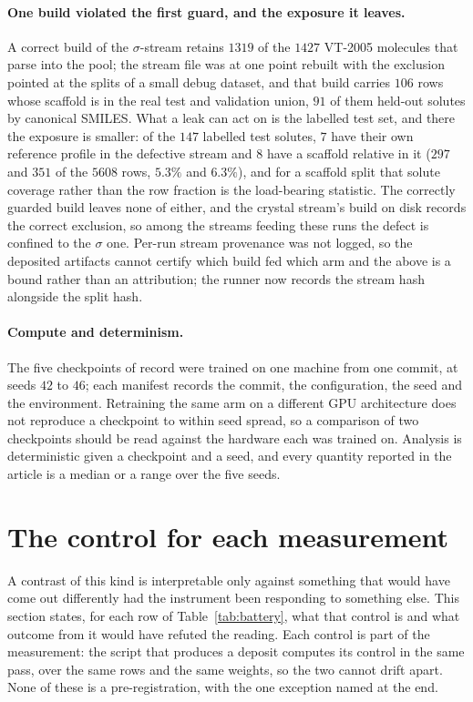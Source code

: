\paragraph{One build violated the first guard, and the exposure it leaves.}
A correct build of the $\sigma$-stream retains $1319$ of the $1427$ VT-2005 molecules that parse
into the pool; the stream file was at one point rebuilt with the exclusion pointed at the splits of
a small debug dataset, and that build carries $106$ rows whose scaffold is in the real test and
validation union, $91$ of them held-out solutes by canonical SMILES. What a leak can act on is the
labelled test set, and there the exposure is smaller: of the $147$ labelled test solutes, $7$ have
their own reference profile in the defective stream and $8$ have a scaffold relative in it ($297$
and $351$ of the $5608$ rows, $5.3\%$ and $6.3\%$), and for a scaffold split that solute coverage
rather than the row fraction is the load-bearing statistic. The correctly guarded build leaves none of either, and the crystal
stream's build on disk records the correct exclusion, so among the streams feeding these runs the
defect is confined to the $\sigma$ one. Per-run stream provenance was not logged, so the deposited
artifacts cannot certify which build fed which arm and the above is a bound rather than an
attribution; the runner now records the stream hash alongside the split hash.

\paragraph{Compute and determinism.}
The five checkpoints of record were trained on one machine from one commit, at seeds $42$ to $46$;
each manifest records the commit, the configuration, the seed and the environment. Retraining the
same arm on a different GPU architecture does not reproduce a checkpoint to within seed spread, so
a comparison of two checkpoints should be read against the hardware each was trained on. Analysis
is deterministic given a checkpoint and a seed, and every quantity reported in the article is a
median or a range over the five seeds.



\section{The control for each measurement}
\label{si:rules}

A contrast of this kind is interpretable only against something that would have come out
differently had the instrument been responding to something else. This section states, for each
row of Table~\ref{tab:battery}, what that control is and what outcome from it would have refuted
the reading. Each control is part of the measurement: the script that produces a deposit computes
its control in the same pass, over the same rows and the same weights, so the two cannot drift
apart. None of these is a pre-registration, with the one exception named at the end.

